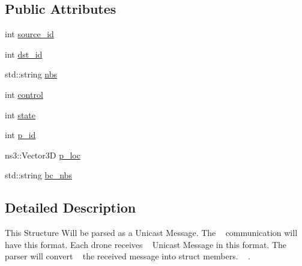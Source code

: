 \subsection*{Public Attributes}
\begin{DoxyCompactItemize}
\item 
int \hyperlink{structrnl_1_1URMsg_aba36df412b09ba5028442c4ea7c1bb36}{source\+\_\+id}
\item 
int \hyperlink{structrnl_1_1URMsg_a947b43eec8c0304c471e5260398d6cad}{dst\+\_\+id}
\item 
std\+::string \hyperlink{structrnl_1_1URMsg_a464d0a68407e00b860a9c3f89ae9bb0f}{nbs}
\item 
int \hyperlink{structrnl_1_1URMsg_ace6238b8706cceab9ed81420affce197}{control}
\item 
int \hyperlink{structrnl_1_1URMsg_aeae1d18c4f3a5d08ae319d9281d13a17}{state}
\item 
int \hyperlink{structrnl_1_1URMsg_a2c715d2283dc3c67b4d8bb5a842f4d50}{p\+\_\+id}
\item 
ns3\+::\+Vector3D \hyperlink{structrnl_1_1URMsg_a49ec7a35da6a24a3c93775322c7ed91f}{p\+\_\+loc}
\item 
std\+::string \hyperlink{structrnl_1_1URMsg_a38fb7f6309191c22846ee787b7d92d07}{bc\+\_\+nbs}
\end{DoxyCompactItemize}


\subsection{Detailed Description}
This Structure Will be parsed as a Unicast Message. The ~\newline
communication will have this format. Each drone receives ~\newline
Unicast Message in this format. The parser will convert ~\newline
the received message into struct members. ~\newline
. 


